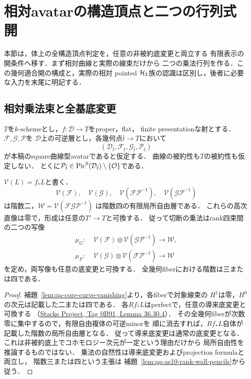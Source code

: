 \section{相対avatarの構造頂点と二つの行列式開}
\label{sec:qa-relative-vertex-determinants}

本節は，体上の全構造頂点判定を，任意の非被約底変更と両立する
有限表示の開条件へ移す．まず相対曲線と実際の線束だけから
二つの乗法行列を作る．この幾何適合開の構成と，実際の相対
pointed $\mathcal H_2$族の認識は区別し，後者に必要な入力を末尾に明記する．

\subsection{相対乗法束と全基底変更}

$T$を$k$-schemeとし，$f:\mathcal D\to T$をproper，flat，
finite presentationな射とする．$\mathcal F,\mathcal G,\mathcal P$を
$\mathcal D$上の可逆層とし，各幾何点$\bar t\to T$において
\[
 (\mathcal D_{\bar t},\mathcal F_{\bar t},
   \mathcal G_{\bar t},\mathcal P_{\bar t})
\]
が本稿のsquare曲線型avatarであると仮定する．
曲線の被約性も$T$の被約性も仮定しない．
とくに$\mathcal P_{\bar t}\in\operatorname{Pic}^0(\mathcal D_{\bar t})
\setminus\{\mathcal O\}$である．

\begin{lemma}[二つのrank四乗法束]
\label{lem:qa-relative-pencil-multiplication-bundles}
$\mathcal V(L)=f_*L$と書く．
\[
\mathcal V(\mathcal F),\quad\mathcal V(\mathcal G),\quad
\mathcal V(\mathcal F\mathcal P^{-1}),\quad
\mathcal V(\mathcal G\mathcal P^{-1})
\]
は階数二，$\mathcal W=\mathcal V(\mathcal F\mathcal G\mathcal P^{-1})$
は階数四の有限局所自由層である．
これらの高次直像は零で，形成は任意の$T'\to T$と可換する．
従って切断の乗法はrank四束間の二つの写像
\begin{align}
 \mu_G:&\ \mathcal V(\mathcal F)\otimes
          \mathcal V(\mathcal G\mathcal P^{-1})\longrightarrow\mathcal W,
          \label{eq:qa-relative-mu-g}\\
 \mu_F:&\ \mathcal V(\mathcal G)\otimes
          \mathcal V(\mathcal F\mathcal P^{-1})\longrightarrow\mathcal W
          \label{eq:qa-relative-mu-f}
\end{align}
を定め，両写像も任意の底変更と可換する．
全幾何fiberにおける階数は三または四である．
\end{lemma}
\begin{proof}
補題~\ref{lem:qa-core-curve-vanishing}より，各fiberで対象線束の
$H^1$は零，$H^0$の次元は記載した二または四である．
各$Rf_*L$はperfectで，任意の導来底変更と可換する
（\href{https://stacks.math.columbia.edu/tag/0B91}
{Stacks Project, Tag 0B91, Lemma 36.30.4}）．
その全幾何fiberが次数零に集中するので，有限自由複体の可逆minorを
順に消去すれば，$Rf_*L$自体が記載した階数の局所自由層となる．
従って導来底変更は通常の底変更となる．
これは非被約底上でコホモロジー次元が一定という理由だけから
局所自由性を推論するものではない．
乗法の自然性は導来底変更およびprojection formulaと両立し，
階数三または四という主張は
補題~\ref{lem:qa-as10-rank-wall-pencils}から従う．
\end{proof}

